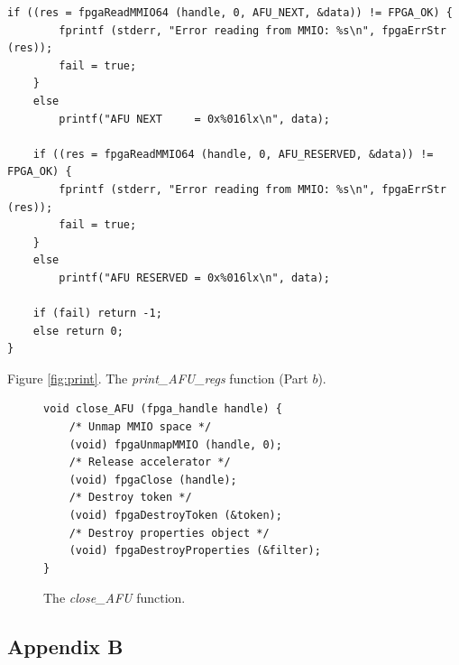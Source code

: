 \documentclass[epsfig,10pt,fullpage]{article}
\begin{document}
\lstset{language=C,numbers=none,escapechar=|}
\begin{minipage}[t]{\textwidth}
\begin{lstlisting}[name=AFU]
    if ((res = fpgaReadMMIO64 (handle, 0, AFU_NEXT, &data)) != FPGA_OK) {
        fprintf (stderr, "Error reading from MMIO: %s\n", fpgaErrStr (res));
        fail = true;
    }
    else
        printf("AFU NEXT     = 0x%016lx\n", data);
    
    if ((res = fpgaReadMMIO64 (handle, 0, AFU_RESERVED, &data)) != FPGA_OK) {
        fprintf (stderr, "Error reading from MMIO: %s\n", fpgaErrStr (res));
        fail = true;
    }
    else
        printf("AFU RESERVED = 0x%016lx\n", data);

    if (fail) return -1;
    else return 0;
}
\end{lstlisting}
\begin{center}
Figure \ref{fig:print}. The {\it print\_AFU\_regs} function (Part $b$).
\end{center}
\end{minipage}
\lstset{language=C,numbers=none,escapechar=|}
\begin{figure}[H]
\begin{center}
\begin{minipage}[h]{12.5 cm}
\begin{lstlisting}[name=manage]
void close_AFU (fpga_handle handle) {
    /* Unmap MMIO space */
    (void) fpgaUnmapMMIO (handle, 0);
    /* Release accelerator */
    (void) fpgaClose (handle);
    /* Destroy token */
    (void) fpgaDestroyToken (&token);
    /* Destroy properties object */
    (void) fpgaDestroyProperties (&filter);
}
\end{lstlisting}
\end{minipage}
\caption{The {\it close\_AFU} function.}
\label{fig:close}
\end{center}
\end{figure}
\newpage
\begin{center}\section*{Appendix B}\end{center}
\end{document}
